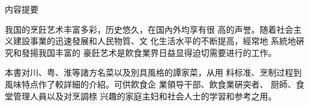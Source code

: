 内容提要

我国的烹飪艺术丰富多彩，历史悠久，在国內外均享有很 高的声誉。随着社会主义建設事業的迅速發展和人民物質、文 化生活水平的不断提高，經常地
系統地硏究和發揚我国丰富的 豪飪艺术是飮食業界日益显得迫切需要进行的工作。

本書对川、粤、淮等諸方名菜以及別具風格的譚家菜，从用 料标准、烹制过程到風味特点作了較詳細的介紹。可供飮食企 業領导干部、飲食業硏突者、
厨師、食堂管理人員以及对烹調榇 兴趣的家庭主妇和社会人士的学習和参考之用。
